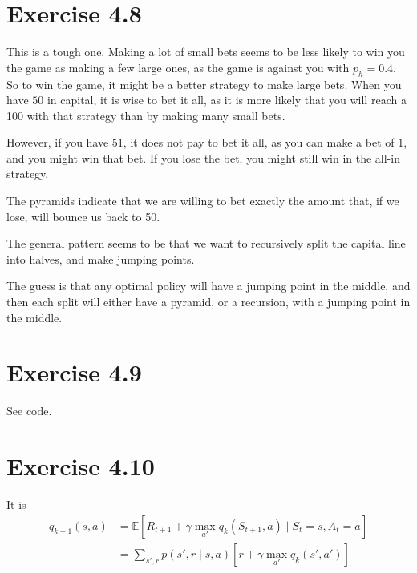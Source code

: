 \documentclass[a4paper,11pt,reqno]{amsart}
\begin{document}
\section*{Exercise 4.8}
This is a tough one. Making a lot of small bets seems to be less likely to win you the game as making a few large ones, as the game is against you with $p_h = 0.4$. So to win the game, it might be a better strategy to make large bets. When you have $50$ in capital, it is wise to bet it all, as it is more likely that you will reach a 100 with that strategy than by making many small bets. 

However, if you have $51$, it does not pay to bet it all, as you can make a bet of $1$, and you might win that bet. If you lose the bet, you might still win in the all-in strategy. 

The pyramids indicate that we are willing to bet exactly the amount that, if we lose, will bounce us back to 50. 

The general pattern seems to be that we want to recursively split the capital line into halves, and make jumping points. 

The guess is that any optimal policy will have a jumping point in the middle, and then each split will either have a pyramid, or a recursion, with a jumping point in the middle. 

\section*{Exercise 4.9}
See code.

\section*{Exercise 4.10}
It is
\begin{align}
q_{k+1}(s, a) &= \mathbb{E}\left[ 
    R_{t+1} + 
    \gamma  \max_{a'}  q_{k}(S_{t+1}, a)  \mid S_t = s, A_t = a
\right]  \\
&= \sum_{s', r} p(s', r \mid s, a) \left[ r + \gamma \max_{a'}q_{k}(s', a') \right]
\end{align}
\end{document}
